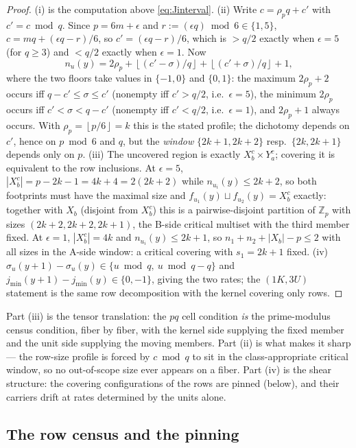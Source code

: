 \documentclass[11pt,a4paper]{article}
\numberwithin{equation}{section}
\theoremstyle{plain}
\theoremstyle{plain}
\theoremstyle{definition}
\theoremstyle{remark}
\newcommand{\Z}{\mathbb{Z}}
\newcommand{\floor}[1]{\left\lfloor #1 \right\rfloor}
\begin{document}
\begin{proof}
(i) is the computation above \eqref{eq:Jinterval}. (ii) Write
$c=\rho_p q+c'$ with $c'=c\bmod q$. Since $p=6m+\epsilon$ and
$r:=(\epsilon q)\bmod 6\in\{1,5\}$,
$c=mq+(\epsilon q-r)/6$, so $c'=(\epsilon q-r)/6$, which is $>q/2$ exactly
when $\epsilon=5$ (for $q\ge 3$) and $<q/2$ exactly when $\epsilon=1$. Now
\[
n_u(y)=2\rho_p+\floor{(c'-\sigma)/q}+\floor{(c'+\sigma)/q}+1,
\]
where the two floors take values in $\{-1,0\}$ and $\{0,1\}$: the maximum
$2\rho_p+2$ occurs iff $q-c'\le\sigma\le c'$ (nonempty iff $c'>q/2$, i.e.\
$\epsilon=5$), the minimum $2\rho_p$ occurs iff
$c'<\sigma<q-c'$ (nonempty iff $c'<q/2$, i.e.\ $\epsilon=1$), and
$2\rho_p+1$ always occurs. With $\rho_p=\floor{p/6}=k$ this is the stated
profile; the dichotomy depends on $c'$, hence on $p\bmod 6$ and $q$, but the
\emph{window} $\{2k{+}1,2k{+}2\}$ resp.\ $\{2k,2k{+}1\}$ depends only on
$p$. (iii) The uncovered region is exactly $X_b^c\times Y_a^c$; covering it
is equivalent to the row inclusions. At $\epsilon=5$,
$|X_b^{c}|=p-2k-1=4k+4=2(2k+2)$ while $n_{u_i}(y)\le 2k+2$, so both
footprints must have the maximal size and
$f_{u_1}(y)\sqcup f_{u_2}(y)=X_b^{c}$ exactly: together with $X_b$ (disjoint
from $X_b^{c}$) this is a pairwise-disjoint partition of $\Z_p$ with sizes
$(2k+2,2k+2,2k+1)$, the B-side critical multiset with the third member fixed.
At $\epsilon=1$, $|X_b^{c}|=4k$ and $n_{u_i}(y)\le 2k+1$, so
$n_1+n_2+|X_b|-p\le 2$ with all sizes in the A-side window: a critical
covering with $s_1=2k+1$ fixed. (iv) $\sigma_u(y{+}1)-\sigma_u(y)\in\{u
\bmod q,\ u\bmod q-q\}$ and $j_{\min}(y{+}1)-j_{\min}(y)\in\{0,-1\}$, giving
the two rates; the $(1K,3U)$ statement is the same row decomposition with the
kernel covering only rows.
\end{proof}

Part (iii) is the tensor translation: the $pq$ cell condition \emph{is} the
prime-modulus census condition, fiber by fiber, with the kernel side
supplying the fixed member and the unit side supplying the moving members.
Part (ii) is what makes it sharp --- the row-size profile is forced by
$c\bmod q$ to sit in the class-appropriate critical window, so no
out-of-scope size ever appears on a fiber. Part (iv) is the shear structure:
the covering configurations of the rows are pinned (below), and their
carriers drift at rates determined by the units alone.

\subsection{The row census and the pinning}\label{sec:pq-census}
\end{document}
